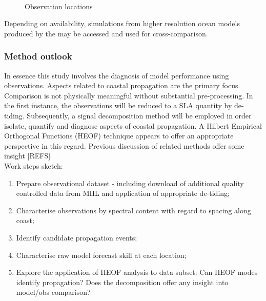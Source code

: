 \begin{figure}[!h]
	\centering
	\\
	\caption{Observation locations}
	\label{fig:tide_gauges}
\end{figure}

Depending on availability, simulations from higher resolution ocean models produced by the \BOM{} may be accessed and used for cross-comparison.


\subsubsection{Method outlook}
In essence this study involves the diagnosis of model performance using observations.  Aspects related to coastal propagation are the primary focus.\\ 
Comparison is not physically meaningful without substantial pre-processing.  In the first instance, the observations will be reduced to a SLA quantity by de-tiding.  Subsequently, a signal decomposition method will be employed in order isolate, quantify and diagnose aspects of coastal propagation.  A Hilbert Empirical Orthogonal Functions (HEOF) technique appears to offer an appropriate perspective in this regard.  Previous discussion of related methods offer some insight [REFS]\\

Work steps sketch:
\begin{enumerate}
\item Prepare observational dataset - including download of additional quality controlled data from MHL and application of appropriate de-tiding; 
\item Characterise observations by spectral content with regard to spacing along coast;
\item Identify candidate propagation events;
\item Characterise raw model forecast skill at each location;
\item Explore the application of HEOF analysis to data subset: Can HEOF modes identify propagation? Does the decomposition offer any insight into model/obs comparison?
\end{enumerate}




